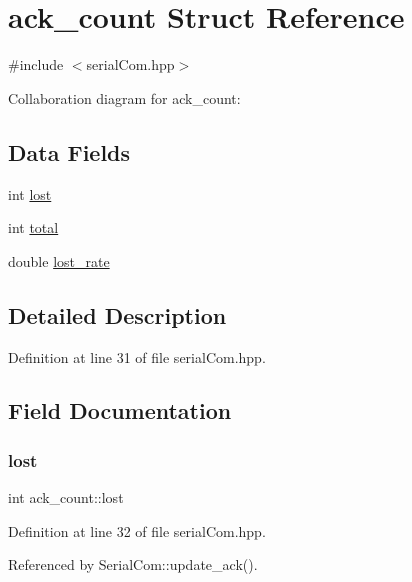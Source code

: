\hypertarget{structack__count}{}\section{ack\+\_\+count Struct Reference}
\label{structack__count}


{\ttfamily \#include $<$serial\+Com.\+hpp$>$}



Collaboration diagram for ack\+\_\+count\+:
\subsection*{Data Fields}
\begin{DoxyCompactItemize}
\item 
int \hyperlink{structack__count_a621179b83751cda8db5f662d8bf0f591}{lost}
\item 
int \hyperlink{structack__count_acad0aaa27c2d3742cd2d1dec03374cc0}{total}
\item 
double \hyperlink{structack__count_a5727e1fe59488611b16b22b82af97e52}{lost\+\_\+rate}
\end{DoxyCompactItemize}


\subsection{Detailed Description}


Definition at line 31 of file serial\+Com.\+hpp.



\subsection{Field Documentation}
\mbox{\label{structack__count_a621179b83751cda8db5f662d8bf0f591}} 
\subsubsection{\texorpdfstring{lost}{lost}}
{\footnotesize\ttfamily int ack\+\_\+count\+::lost}



Definition at line 32 of file serial\+Com.\+hpp.



Referenced by Serial\+Com\+::update\+\_\+ack().

